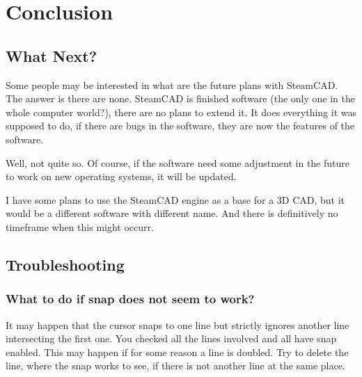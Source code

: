 \chapter{Conclusion}\label{chap:chap4}

\section{What Next?}

Some people may be interested in what are the future plans with SteamCAD. The answer is
there are none. SteamCAD is finished software (the only one in the whole computer world?),
there are no plans to extend it. It does everything it was supposed to do, if there are
bugs in the software, they are now the features of the software.

Well, not quite so. Of course, if the software need some adjustment in the future to
work on new operating systems, it will be updated.

I have some plans to use the SteamCAD engine as a base for a 3D CAD, but it would be
a different software with different name. And there is definitively no timeframe when this
might occurr.

\section{Troubleshooting}

\subsection{What to do if snap does not seem to work?}
It may happen that the cursor snaps to one line but strictly ignores another line
intersecting the first one. You checked all the lines involved and all have snap enabled.
This may happen if for some reason a line is doubled. Try to delete the line, where the
snap works to see, if there is not another line at the same place.

